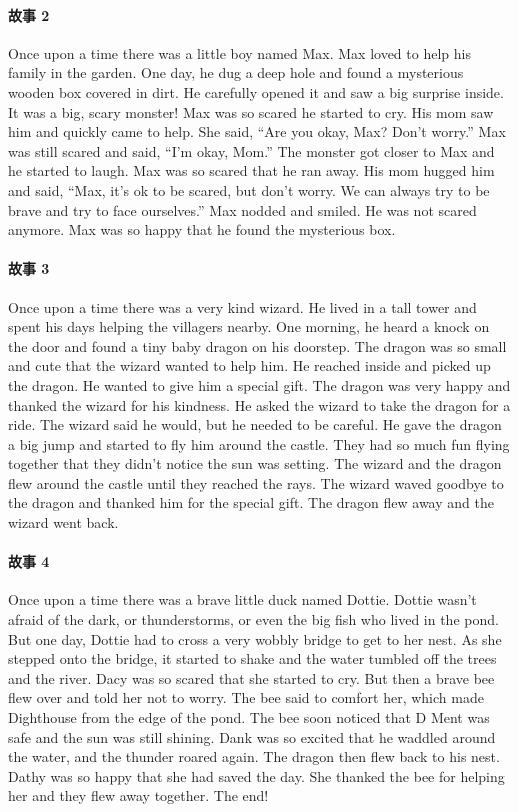 \documentclass{article}
\begin{document}
\paragraph{故事 2}
\textcolor{gray!60}{Once upon a time there was a little boy named Max. Max loved to help his family in the garden. One day, he dug a deep hole and found a mysterious wooden box covered in dirt. He carefully opened it and saw} a big surprise inside. It was a big, scary monster! Max was so scared he started to cry. His mom saw him and quickly came to help. She said, ``Are you okay, Max? Don't worry.'' Max was still scared and said, ``I'm okay, Mom.'' The monster got closer to Max and he started to laugh. Max was so scared that he ran away. His mom hugged him and said, ``Max, it's ok to be scared, but don't worry. We can always try to be brave and try to face ourselves.'' Max nodded and smiled. He was not scared anymore. Max was so happy that he found the mysterious box.

\paragraph{故事 3}
\textcolor{gray!60}{Once upon a time there was a very kind wizard. He lived in a tall tower and spent his days helping the villagers nearby. One morning, he heard a knock on the door and found a tiny baby dragon on his doorstep.} The dragon was so small and cute that the wizard wanted to help him. He reached inside and picked up the dragon. He wanted to give him a special gift. The dragon was very happy and thanked the wizard for his kindness. He asked the wizard to take the dragon for a ride. The wizard said he would, but he needed to be careful. He gave the dragon a big jump and started to fly him around the castle. They had so much fun flying together that they didn't notice the sun was setting. The wizard and the dragon flew around the castle until they reached the rays. The wizard waved goodbye to the dragon and thanked him for the special gift. The dragon flew away and the wizard went back.

\paragraph{故事 4}
\textcolor{gray!60}{Once upon a time there was a brave little duck named Dottie. Dottie wasn't afraid of the dark, or thunderstorms, or even the big fish who lived in the pond. But one day, Dottie had to cross a very wobbly bridge to get to her nest. As she stepped onto the bridge,} it started to shake and the water tumbled off the trees and the river. Dacy was so scared that she started to cry. But then a brave bee flew over and told her not to worry. The bee said to comfort her, which made Dighthouse from the edge of the pond. The bee soon noticed that D Ment was safe and the sun was still shining. Dank was so excited that he waddled around the water, and the thunder roared again. The dragon then flew back to his nest. Dathy was so happy that she had saved the day. She thanked the bee for helping her and they flew away together. The end!
\end{document}
